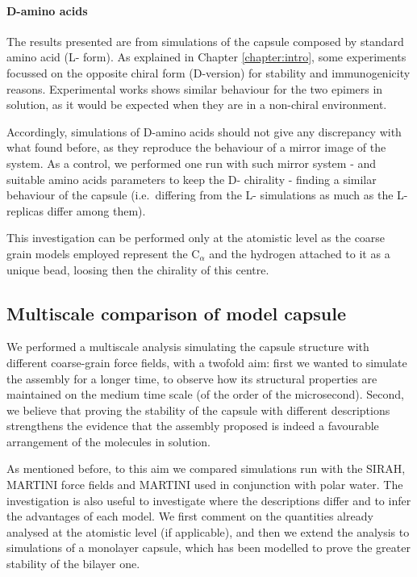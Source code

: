 \paragraph{D-amino acids} The results presented are from simulations of the capsule composed by standard amino acid (L- form). As explained in Chapter \ref{chapter:intro}, some experiments focussed on the opposite chiral form (D-version) for stability and immunogenicity reasons. Experimental works shows similar behaviour for the two epimers in solution, as it would be expected when they are in a non-chiral environment.

Accordingly, simulations of D-amino acids should not give any discrepancy with what found before, as they reproduce the behaviour of a mirror image of the system. As a control, we performed one run with such mirror system - and suitable amino acids parameters to keep the D- chirality - finding a similar behaviour of the capsule (i.e.\ differing from the L- simulations as much as the L- replicas differ among them).

This investigation can be performed only at the atomistic level as the coarse grain models employed represent the C$_\alpha$ and the hydrogen attached to it as a unique bead, loosing then the chirality of this centre.


\subsection{Multiscale comparison of model capsule} \label{sec:res_multiscale}

We performed a multiscale analysis simulating the capsule structure with different coarse-grain force fields, with a twofold aim: first we wanted to simulate the assembly for a longer time, to observe how its structural properties are maintained on the medium time scale (of the order of the microsecond). Second, we believe that proving the stability of the capsule with different descriptions strengthens the evidence that the assembly proposed is indeed a favourable arrangement of the molecules in solution.

As mentioned before, to this aim we compared simulations run with the SIRAH, MARTINI force fields and MARTINI used in conjunction with polar water. The investigation is also useful to investigate where the descriptions differ and to infer the advantages of each model.
%
We first comment on the quantities already analysed at the atomistic level (if applicable), and then we extend the analysis to simulations of a monolayer capsule, which has been modelled to prove the greater stability of the bilayer one.

